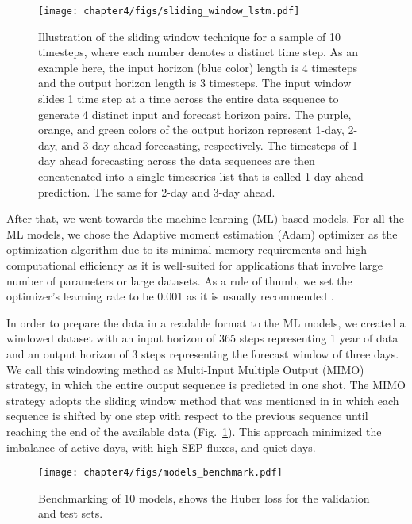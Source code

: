 \begin{figure}[htp]
    \centerline{\texttt{[image: chapter4/figs/sliding\_window\_lstm.pdf]}}
    \caption{Illustration of the sliding window technique for a sample of 10 timesteps, where each number denotes a distinct time step. As an example here, the input horizon (blue color) length is 4 timesteps and the output horizon length is 3 timesteps. The input window slides 1 time step at a time across the entire data sequence to generate 4 distinct input and forecast horizon pairs. The purple, orange, and green colors of the output horizon represent 1-day, 2-day, and 3-day ahead forecasting, respectively. The timesteps of 1-day ahead forecasting across the data sequences are then concatenated into a single timeseries list that is called 1-day ahead prediction. The same for 2-day and 3-day ahead.}
\label{fig_slide_window}
\end{figure}

After that, we went towards the machine learning (ML)-based models. For all the ML models, we chose the Adaptive moment estimation (Adam) optimizer \citep{kingma_2015} as the optimization algorithm due to its minimal memory requirements and high computational efficiency as it is well-suited for applications that involve large number of parameters or large datasets. As a rule of thumb, we set the optimizer’s learning rate to be 0.001 as it is usually recommended \citep{zhang_2022}.

In order to prepare the data in a readable format to the ML models, we created a windowed dataset with an input horizon of 365 steps representing 1 year of data and an output horizon of 3 steps representing the forecast window of three days. We call this windowing method as Multi-Input Multiple Output (MIMO) strategy, in which the entire output sequence is predicted in one shot. The MIMO strategy adopts the sliding window method that was mentioned in \citet{benson_2020} in which each sequence is shifted by one step with respect to the previous sequence until reaching the end of the available data (Fig.~\ref{fig_slide_window}).
This approach minimized the imbalance of active days, with high SEP fluxes, and quiet days.

\begin{figure}[htp]
    \centerline{\texttt{[image: chapter4/figs/models\_benchmark.pdf]}}
    \caption{Benchmarking of 10 models, shows the Huber loss for the validation and test sets.}
\label{fig_benchmark}
\end{figure}

